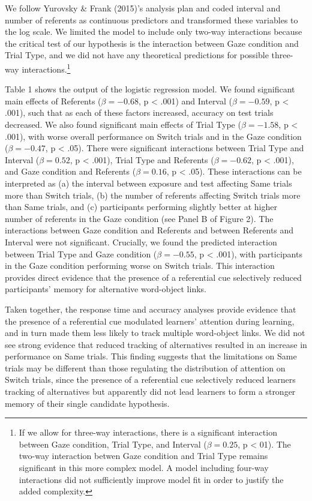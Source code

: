 \documentclass[a4paper,man,floatsintext]{apa6}
\begin{document}
\noindent We follow Yurovsky \& Frank (2015)'s analysis plan and coded
interval and number of referents as continuous predictors and
transformed these variables to the log scale. We limited the model to
include only two-way interactions because the critical test of our
hypothesis is the interaction between Gaze condition and Trial Type, and
we did not have any theoretical predictions for possible three-way
interactions.\footnote{If we allow for three-way interactions, there is
  a significant interaction between Gaze condition, Trial Type, and
  Interval (\(\beta = 0.25\), p \textless{} 01). The two-way interaction
  betwen Gaze condition and Trial Type remains significant in this more
  complex model. A model including four-way interactions did not
  sufficiently improve model fit in order to justify the added
  complexity.}

Table 1 shows the output of the logistic regression model. We found
significant main effects of Referents (\(\beta = -0.68\), p \textless{}
.001) and Interval (\(\beta = -0.59\), p \textless{} .001), such that as
each of these factors increased, accuracy on test trials decreased. We
also found significant main effects of Trial Type (\(\beta = -1.58\), p
\textless{} .001), with worse overall performance on Switch trials and
in the Gaze condition (\(\beta = -0.47\), p \textless{} .05). There were
significant interactions between Trial Type and Interval
(\(\beta = 0.52\), p \textless{} .001), Trial Type and Referents
(\(\beta = -0.62\), p \textless{} .001), and Gaze condition and
Referents (\(\beta = 0.16\), p \textless{} .05). These interactions can
be interpreted as (a) the interval between exposure and test affecting
Same trials more than Switch trials, (b) the number of referents
affecting Switch trials more than Same trials, and (c) participants
performing slightly better at higher number of referents in the Gaze
condition (see Panel B of Figure 2). The interactions between Gaze
condition and Referents and between Referents and Interval were not
significant. Crucially, we found the predicted interaction between Trial
Type and Gaze condition (\(\beta = -0.55\), p \textless{} .001), with
participants in the Gaze condition performing worse on Switch trials.
This interaction provides direct evidence that the presence of a
referential cue selectively reduced participants' memory for alternative
word-object links.

Taken together, the response time and accuracy analyses provide evidence
that the presence of a referential cue modulated learners' attention
during learning, and in turn made them less likely to track multiple
word-object links. We did not see strong evidence that reduced tracking
of alternatives resulted in an increase in performance on Same trials.
This finding suggests that the limitations on Same trials may be
different than those regulating the distribution of attention on Switch
trials, since the presence of a referential cue selectively reduced
learners tracking of alternatives but apparently did not lead learners
to form a stronger memory of their single candidate hypothesis.
\end{document}
